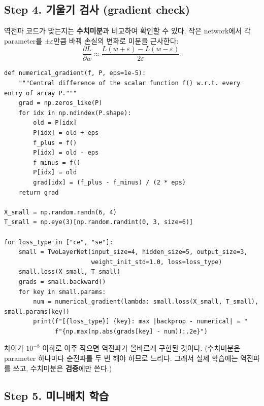 \documentclass[11pt,a4paper]{article}
\newcommand{\pd}[2]{\frac{\partial #1}{\partial #2}}
\begin{document}
\subsection{Step 4. 기울기 검사 (gradient check)}

역전파 코드가 맞는지는 \textbf{수치미분}과 비교하여 확인할 수 있다.
작은 network에서 각 parameter를 $\pm\varepsilon$만큼 바꿔 손실의 변화로 미분을 근사한다:
\[
\pd{L}{w}\approx\frac{L(w+\varepsilon)-L(w-\varepsilon)}{2\varepsilon}.
\]

\begin{lstlisting}
def numerical_gradient(f, P, eps=1e-5):
    """Central difference of the scalar function f() w.r.t. every entry of array P."""
    grad = np.zeros_like(P)
    for idx in np.ndindex(P.shape):
        old = P[idx]
        P[idx] = old + eps
        f_plus = f()
        P[idx] = old - eps
        f_minus = f()
        P[idx] = old
        grad[idx] = (f_plus - f_minus) / (2 * eps)
    return grad

X_small = np.random.randn(6, 4)
T_small = np.eye(3)[np.random.randint(0, 3, size=6)]

for loss_type in ["ce", "se"]:
    small = TwoLayerNet(input_size=4, hidden_size=5, output_size=3,
                        weight_init_std=1.0, loss=loss_type)
    small.loss(X_small, T_small)
    grads = small.backward()
    for key in small.params:
        num = numerical_gradient(lambda: small.loss(X_small, T_small), small.params[key])
        print(f"[{loss_type}] {key}: max |backprop - numerical| = "
              f"{np.max(np.abs(grads[key] - num)):.2e}")
\end{lstlisting}

차이가 $10^{-8}$ 이하로 아주 작으면 역전파가 올바르게 구현된 것이다.
(수치미분은 parameter 하나마다 순전파를 두 번 해야 하므로 느리다.
그래서 실제 학습에는 역전파를 쓰고, 수치미분은 \textbf{검증}에만 쓴다.)

\subsection{Step 5. 미니배치 학습}
\end{document}

